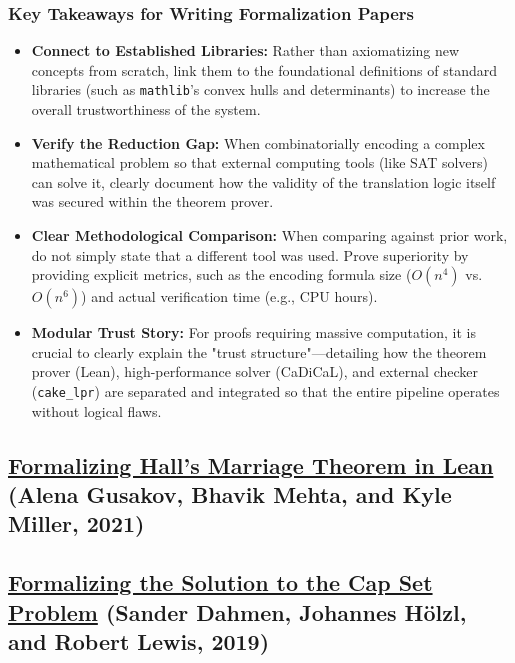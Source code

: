 \documentclass{article}
\begin{document}
\subsubsection{Key Takeaways for Writing Formalization Papers}
\begin{itemize}
    \item \textbf{Connect to Established Libraries:} Rather than axiomatizing new concepts from scratch, link them to the foundational definitions of standard libraries (such as \texttt{mathlib}'s convex hulls and determinants) to increase the overall trustworthiness of the system.
    \item \textbf{Verify the Reduction Gap:} When combinatorially encoding a complex mathematical problem so that external computing tools (like SAT solvers) can solve it, clearly document how the validity of the translation logic itself was secured within the theorem prover.
    \item \textbf{Clear Methodological Comparison:} When comparing against prior work, do not simply state that a different tool was used. Prove superiority by providing explicit metrics, such as the encoding formula size ($O(n^4)$ vs. $O(n^6)$) and actual verification time (e.g., CPU hours).
    \item \textbf{Modular Trust Story:} For proofs requiring massive computation, it is crucial to clearly explain the "trust structure"—detailing how the theorem prover (Lean), high-performance solver (CaDiCaL), and external checker (\texttt{cake\_lpr}) are separated and integrated so that the entire pipeline operates without logical flaws.
\end{itemize}

\subsection{\href{https://arxiv.org/abs/2101.00127}{\textbf{Formalizing Hall's Marriage Theorem in Lean}} (Alena Gusakov, Bhavik Mehta, and Kyle Miller, 2021)}

\subsection{\href{https://drops.dagstuhl.de/storage/00lipics/lipics-vol141-itp2019/LIPIcs.ITP.2019.15/LIPIcs.ITP.2019.15.pdf}{\textbf{Formalizing the Solution to the Cap Set Problem}} (Sander Dahmen, Johannes Hölzl, and Robert Lewis, 2019)}
\end{document}
